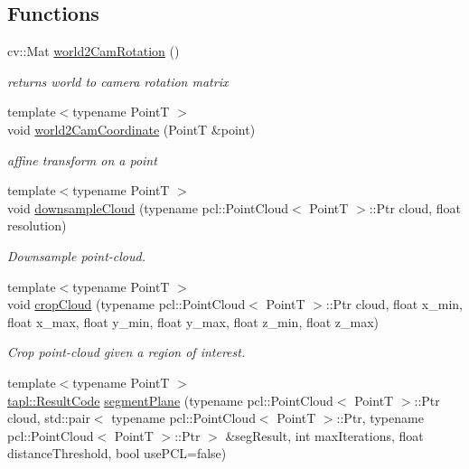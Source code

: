 \subsection*{Functions}
\begin{DoxyCompactItemize}
\item 
cv\+::\+Mat \hyperlink{namespacetapl_1_1pte_a874efe99ea9c6366ae0c0329554ad200}{world2\+Cam\+Rotation} ()
\begin{DoxyCompactList}\small\item\em returns world to camera rotation matrix \end{DoxyCompactList}\item 
{\footnotesize template$<$typename PointT $>$ }\\void \hyperlink{namespacetapl_1_1pte_a928126360beb48c632ff331ca560a1b0}{world2\+Cam\+Coordinate} (PointT \&point)
\begin{DoxyCompactList}\small\item\em affine transform on a point \end{DoxyCompactList}\item 
{\footnotesize template$<$typename PointT $>$ }\\void \hyperlink{namespacetapl_1_1pte_a48c0b0806659501276e0b33042e2fa5b}{downsample\+Cloud} (typename pcl\+::\+Point\+Cloud$<$ PointT $>$\+::Ptr cloud, float resolution)
\begin{DoxyCompactList}\small\item\em Downsample point-\/cloud. \end{DoxyCompactList}\item 
{\footnotesize template$<$typename PointT $>$ }\\void \hyperlink{namespacetapl_1_1pte_adaa36d31de7cd145e875901dfa13a616}{crop\+Cloud} (typename pcl\+::\+Point\+Cloud$<$ PointT $>$\+::Ptr cloud, float x\+\_\+min, float x\+\_\+max, float y\+\_\+min, float y\+\_\+max, float z\+\_\+min, float z\+\_\+max)
\begin{DoxyCompactList}\small\item\em Crop point-\/cloud given a region of interest. \end{DoxyCompactList}\item 
{\footnotesize template$<$typename PointT $>$ }\\\hyperlink{namespacetapl_a196ce1d5bf399fc26f03797e6a8d03ff}{tapl\+::\+Result\+Code} \hyperlink{namespacetapl_1_1pte_aa4fc09affe62218081e85ed5818bf2ef}{segment\+Plane} (typename pcl\+::\+Point\+Cloud$<$ PointT $>$\+::Ptr cloud, std\+::pair$<$ typename pcl\+::\+Point\+Cloud$<$ PointT $>$\+::Ptr, typename pcl\+::\+Point\+Cloud$<$ PointT $>$\+::Ptr $>$ \&seg\+Result, int max\+Iterations, float distance\+Threshold, bool use\+P\+CL=false)

\end{DoxyCompactItemize}
